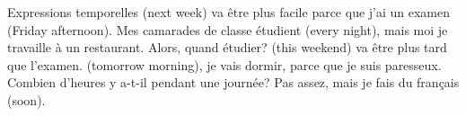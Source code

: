 \begin{frame}{Expressions temporelles }
  \underline{} (next week) va être plus facile parce que j'ai un examen \underline{} (Friday afternoon).
  Mes camarades de classe étudient \underline{} (every night), mais moi je travaille à un restaurant.
  Alors, quand étudier?
  \underline{} (this weekend) va être plus tard que l'examen.
  \underline{} (tomorrow morning), je vais dormir, parce que je suis paresseux.
  Combien d'heures y a-t-il pendant une journée?
  Pas assez, mais je fais du français \underline{} (soon).
\end{frame}